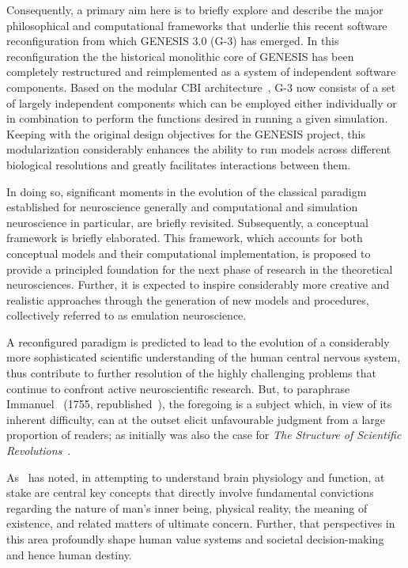 \documentclass[11pt,3p,twocolumn]{JMN}
\begin{document}
Consequently, a primary aim here is to briefly explore and describe the major philosophical and computational frameworks that underlie this recent software reconfiguration from which GENESIS 3.0 (G-3) has emerged. In this reconfiguration the the historical monolithic core of GENESIS has been completely restructured and reimplemented as a system of independent software components. Based on the modular CBI architecture~\citep{cornelis12}, G-3 now consists of a set of largely independent components which can be employed either individually or in combination to perform the functions desired in running a given simulation. Keeping with the original design objectives for the GENESIS project, this modularization considerably enhances the ability to run models across different biological resolutions and greatly facilitates interactions between them.

In doing so, significant moments in the evolution of the classical paradigm established for neuroscience generally and computational and simulation neuroscience in particular, are briefly revisited. Subsequently, a conceptual framework is briefly elaborated. This framework, which accounts for both conceptual models and their computational implementation, is proposed to provide a principled foundation for the next phase of research in the theoretical neurosciences. Further, it is expected to inspire considerably more creative and realistic approaches through the generation of new models and procedures, collectively referred to as emulation neuroscience.

A reconfigured paradigm is predicted to lead to the evolution of a considerably more sophisticated scientific understanding of the human central nervous system, thus contribute to further resolution of the highly challenging problems that continue to confront active neuroscientific research. But, to paraphrase Immanuel~\citeauthor{kant08} (1755, republished~\citeyear{kant08}), the foregoing is a subject which, in view of its inherent difficulty, can at the outset elicit unfavourable judgment from a large proportion of readers; as initially was also the case for {\it The Structure of Scientific Revolutions}~\citep[][see~\citeauthor{bird22}~\citeyear{bird22}]{kuhn96}.

As~\citet{sperry80} has noted, in attempting to understand brain physiology and function, at stake are central key concepts that directly involve fundamental convictions regarding the nature of man's inner being, physical reality, the meaning of existence, and related matters of ultimate concern. Further, that perspectives in this area profoundly shape human value systems and societal decision-making and hence human destiny.
\end{document}
